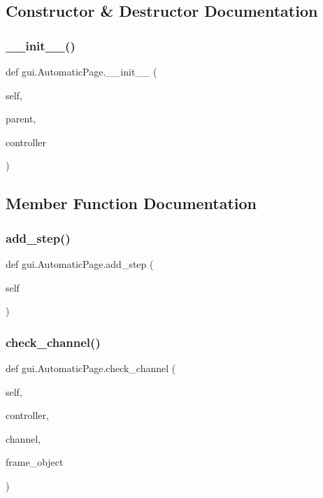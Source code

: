 \subsection{Constructor \& Destructor Documentation}
\mbox{\label{classgui_1_1_automatic_page_a2593e7e7ab658cd0ba4a216f4085eba4}} 
\subsubsection{\texorpdfstring{\_\_init\_\_()}{\_\_init\_\_()}}
{\footnotesize\ttfamily def gui.\+Automatic\+Page.\+\_\+\+\_\+init\+\_\+\+\_\+ (\begin{DoxyParamCaption}\item[{}]{self,  }\item[{}]{parent,  }\item[{}]{controller }\end{DoxyParamCaption})}



\subsection{Member Function Documentation}
\mbox{\label{classgui_1_1_automatic_page_a6b83df77949c781d9e13156faa82f8b5}} 
\subsubsection{\texorpdfstring{add\_step()}{add\_step()}}
{\footnotesize\ttfamily def gui.\+Automatic\+Page.\+add\+\_\+step (\begin{DoxyParamCaption}\item[{}]{self }\end{DoxyParamCaption})}

\mbox{\label{classgui_1_1_automatic_page_a17f4d7d7431114b208912620caa78af6}} 
\subsubsection{\texorpdfstring{check\_channel()}{check\_channel()}}
{\footnotesize\ttfamily def gui.\+Automatic\+Page.\+check\+\_\+channel (\begin{DoxyParamCaption}\item[{}]{self,  }\item[{}]{controller,  }\item[{}]{channel,  }\item[{}]{frame\+\_\+object }\end{DoxyParamCaption})}


